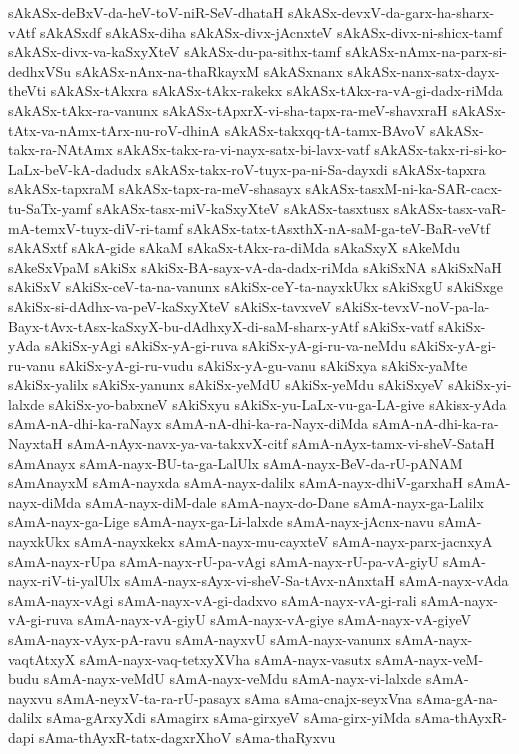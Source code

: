 {sAkASx-deBxV-da-heV-toV-niR-SeV-dhataH
sAkASx-devxV-da-garx-ha-sharx-vAtf
sAkASxdf
sAkASx-diha
sAkASx-divx-jAcnxteV
sAkASx-divx-ni-shicx-tamf
sAkASx-divx-va-kaSxyXteV
sAkASx-du-pa-sithx-tamf
sAkASx-nAmx-na-parx-si-dedhxVSu
sAkASx-nAnx-na-thaRkayxM
sAkASxnanx
sAkASx-nanx-satx-dayx-theVti
sAkASx-tAkxra
sAkASx-tAkx-rakekx
sAkASx-tAkx-ra-vA-gi-dadx-riMda
sAkASx-tAkx-ra-vanunx
sAkASx-tApxrX-vi-sha-tapx-ra-meV-shavxraH
sAkASx-tAtx-va-nAmx-tArx-nu-roV-dhinA
sAkASx-takxqq-tA-tamx-BAvoV
sAkASx-takx-ra-NAtAmx
sAkASx-takx-ra-vi-nayx-satx-bi-lavx-vatf
sAkASx-takx-ri-si-ko-LaLx-beV-kA-dadudx
sAkASx-takx-roV-tuyx-pa-ni-Sa-dayxdi
sAkASx-tapxra
sAkASx-tapxraM
sAkASx-tapx-ra-meV-shasayx
sAkASx-tasxM-ni-ka-SAR-cacx-tu-SaTx-yamf
sAkASx-tasx-miV-kaSxyXteV
sAkASx-tasxtusx
sAkASx-tasx-vaR-mA-temxV-tuyx-diV-ri-tamf
sAkASx-tatx-tAsxthX-nA-saM-ga-teV-BaR-veVtf
sAkASxtf
sAkA-gide
sAkaM
sAkaSx-tAkx-ra-diMda
sAkaSxyX
sAkeMdu
sAkeSxVpaM
sAkiSx
sAkiSx-BA-sayx-vA-da-dadx-riMda
sAkiSxNA
sAkiSxNaH
sAkiSxV
sAkiSx-ceV-ta-na-vanunx
sAkiSx-ceY-ta-nayxkUkx
sAkiSxgU
sAkiSxge
sAkiSx-si-dAdhx-va-peV-kaSxyXteV
sAkiSx-tavxveV
sAkiSx-tevxV-noV-pa-la-Bayx-tAvx-tAsx-kaSxyX-bu-dAdhxyX-di-saM-sharx-yAtf
sAkiSx-vatf
sAkiSx-yAda
sAkiSx-yAgi
sAkiSx-yA-gi-ruva
sAkiSx-yA-gi-ru-va-neMdu
sAkiSx-yA-gi-ru-vanu
sAkiSx-yA-gi-ru-vudu
sAkiSx-yA-gu-vanu
sAkiSxya
sAkiSx-yaMte
sAkiSx-yalilx
sAkiSx-yanunx
sAkiSx-yeMdU
sAkiSx-yeMdu
sAkiSxyeV
sAkiSx-yi-lalxde
sAkiSx-yo-babxneV
sAkiSxyu
sAkiSx-yu-LaLx-vu-ga-LA-give
sAkisx-yAda
sAmA-nA-dhi-ka-raNayx
sAmA-nA-dhi-ka-ra-Nayx-diMda
sAmA-nA-dhi-ka-ra-NayxtaH
sAmA-nAyx-navx-ya-va-takxvX-citf
sAmA-nAyx-tamx-vi-sheV-SataH
sAmAnayx
sAmA-nayx-BU-ta-ga-LalUlx
sAmA-nayx-BeV-da-rU-pANAM
sAmAnayxM
sAmA-nayxda
sAmA-nayx-dalilx
sAmA-nayx-dhiV-garxhaH
sAmA-nayx-diMda
sAmA-nayx-diM-dale
sAmA-nayx-do-Dane
sAmA-nayx-ga-Lalilx
sAmA-nayx-ga-Lige
sAmA-nayx-ga-Li-lalxde
sAmA-nayx-jAcnx-navu
sAmA-nayxkUkx
sAmA-nayxkekx
sAmA-nayx-mu-cayxteV
sAmA-nayx-parx-jacnxyA
sAmA-nayx-rUpa
sAmA-nayx-rU-pa-vAgi
sAmA-nayx-rU-pa-vA-giyU
sAmA-nayx-riV-ti-yalUlx
sAmA-nayx-sAyx-vi-sheV-Sa-tAvx-nAnxtaH
sAmA-nayx-vAda
sAmA-nayx-vAgi
sAmA-nayx-vA-gi-dadxvo
sAmA-nayx-vA-gi-rali
sAmA-nayx-vA-gi-ruva
sAmA-nayx-vA-giyU
sAmA-nayx-vA-giye
sAmA-nayx-vA-giyeV
sAmA-nayx-vAyx-pA-ravu
sAmA-nayxvU
sAmA-nayx-vanunx
sAmA-nayx-vaqtAtxyX
sAmA-nayx-vaq-tetxyXVha
sAmA-nayx-vasutx
sAmA-nayx-veM-budu
sAmA-nayx-veMdU
sAmA-nayx-veMdu
sAmA-nayx-vi-lalxde
sAmA-nayxvu
sAmA-neyxV-ta-ra-rU-pasayx
sAma
sAma-cnajx-seyxVna
sAma-gA-na-dalilx
sAma-gArxyXdi
sAmagirx
sAma-girxyeV
sAma-girx-yiMda
sAma-thAyxR-dapi
sAma-thAyxR-tatx-dagxrXhoV
sAma-thaRyxvu
}

